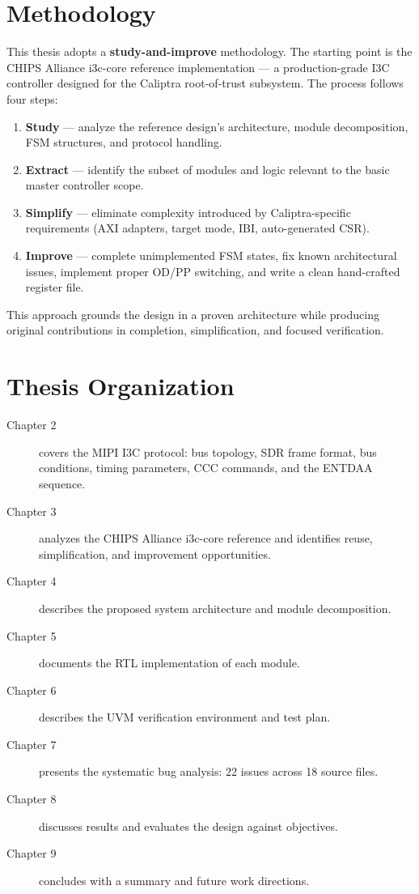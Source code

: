 \documentclass[12pt, a4paper, oneside]{report}
\begin{document}
\section{Methodology}

This thesis adopts a \textbf{study-and-improve} methodology. The starting point is the
CHIPS Alliance i3c-core reference implementation --- a production-grade I3C controller
designed for the Caliptra root-of-trust subsystem. The process follows four steps:

\begin{enumerate}
  \item \textbf{Study} --- analyze the reference design's architecture, module
        decomposition, FSM structures, and protocol handling.
  \item \textbf{Extract} --- identify the subset of modules and logic relevant to the
        basic master controller scope.
  \item \textbf{Simplify} --- eliminate complexity introduced by Caliptra-specific
        requirements (AXI adapters, target mode, IBI, auto-generated CSR).
  \item \textbf{Improve} --- complete unimplemented FSM states, fix known architectural
        issues, implement proper OD/PP switching, and write a clean hand-crafted
        register file.
\end{enumerate}

This approach grounds the design in a proven architecture while producing original
contributions in completion, simplification, and focused verification.

\section{Thesis Organization}

\begin{description}
  \item[Chapter 2] covers the MIPI I3C protocol: bus topology, SDR frame format, bus
        conditions, timing parameters, CCC commands, and the ENTDAA sequence.
  \item[Chapter 3] analyzes the CHIPS Alliance i3c-core reference and identifies reuse,
        simplification, and improvement opportunities.
  \item[Chapter 4] describes the proposed system architecture and module decomposition.
  \item[Chapter 5] documents the RTL implementation of each module.
  \item[Chapter 6] describes the UVM verification environment and test plan.
  \item[Chapter 7] presents the systematic bug analysis: 22 issues across 18 source files.
  \item[Chapter 8] discusses results and evaluates the design against objectives.
  \item[Chapter 9] concludes with a summary and future work directions.
\end{description}
\end{document}
